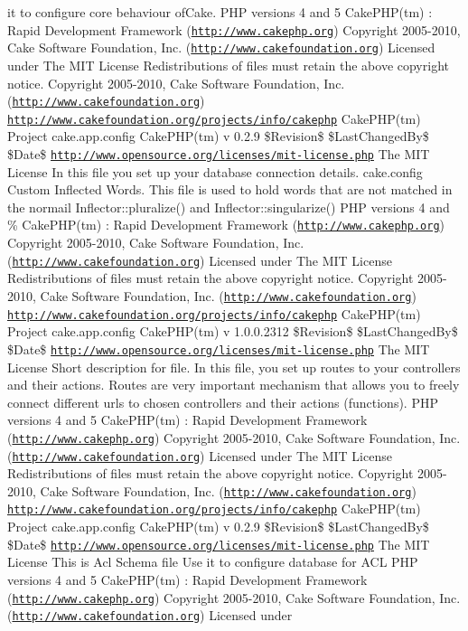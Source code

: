 it to configure core behaviour ofCake.  PHP versions 4 and 5  CakePHP(tm) : Rapid Development Framework (\href{http://www.cakephp.org}{\tt http://www.cakephp.org}) Copyright 2005-\/2010, Cake Software Foundation, Inc. (\href{http://www.cakefoundation.org}{\tt http://www.cakefoundation.org})  Licensed under The MIT License Redistributions of files must retain the above copyright notice.    Copyright 2005-\/2010, Cake Software Foundation, Inc. (\href{http://www.cakefoundation.org}{\tt http://www.cakefoundation.org})  \href{http://www.cakefoundation.org/projects/info/cakephp}{\tt http://www.cakefoundation.org/projects/info/cakephp} CakePHP(tm) Project   cake.app.config  CakePHP(tm) v 0.2.9  \$Revision\$  \$LastChangedBy\$  \$Date\$  \href{http://www.opensource.org/licenses/mit-license.php}{\tt http://www.opensource.org/licenses/mit-\/license.php} The MIT License  In this file you set up your database connection details.   cake.config  Custom Inflected Words.  This file is used to hold words that are not matched in the normail Inflector::pluralize() and Inflector::singularize()  PHP versions 4 and \%  CakePHP(tm) : Rapid Development Framework (\href{http://www.cakephp.org}{\tt http://www.cakephp.org}) Copyright 2005-\/2010, Cake Software Foundation, Inc. (\href{http://www.cakefoundation.org}{\tt http://www.cakefoundation.org})  Licensed under The MIT License Redistributions of files must retain the above copyright notice.    Copyright 2005-\/2010, Cake Software Foundation, Inc. (\href{http://www.cakefoundation.org}{\tt http://www.cakefoundation.org})  \href{http://www.cakefoundation.org/projects/info/cakephp}{\tt http://www.cakefoundation.org/projects/info/cakephp} CakePHP(tm) Project   cake.app.config  CakePHP(tm) v 1.0.0.2312  \$Revision\$  \$LastChangedBy\$  \$Date\$  \href{http://www.opensource.org/licenses/mit-license.php}{\tt http://www.opensource.org/licenses/mit-\/license.php} The MIT License  Short description for file.  In this file, you set up routes to your controllers and their actions. Routes are very important mechanism that allows you to freely connect different urls to chosen controllers and their actions (functions).  PHP versions 4 and 5  CakePHP(tm) : Rapid Development Framework (\href{http://www.cakephp.org}{\tt http://www.cakephp.org}) Copyright 2005-\/2010, Cake Software Foundation, Inc. (\href{http://www.cakefoundation.org}{\tt http://www.cakefoundation.org})  Licensed under The MIT License Redistributions of files must retain the above copyright notice.    Copyright 2005-\/2010, Cake Software Foundation, Inc. (\href{http://www.cakefoundation.org}{\tt http://www.cakefoundation.org})  \href{http://www.cakefoundation.org/projects/info/cakephp}{\tt http://www.cakefoundation.org/projects/info/cakephp} CakePHP(tm) Project   cake.app.config  CakePHP(tm) v 0.2.9  \$Revision\$  \$LastChangedBy\$  \$Date\$  \href{http://www.opensource.org/licenses/mit-license.php}{\tt http://www.opensource.org/licenses/mit-\/license.php} The MIT License  This is Acl Schema file  Use it to configure database for ACL  PHP versions 4 and 5  CakePHP(tm) : Rapid Development Framework (\href{http://www.cakephp.org}{\tt http://www.cakephp.org}) Copyright 2005-\/2010, Cake Software Foundation, Inc. (\href{http://www.cakefoundation.org}{\tt http://www.cakefoundation.org})  Licensed under 